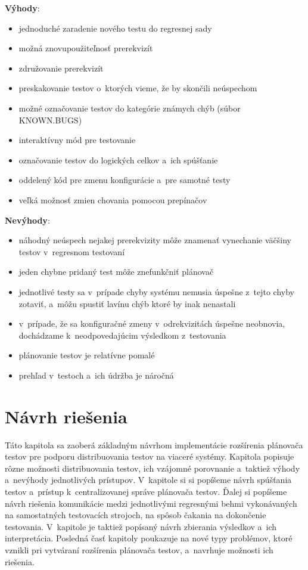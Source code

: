 \noindent \textbf{Výhody}:
\begin{itemize}
\item jednoduché zaradenie nového testu do regresnej sady
\item možná znovupoužiteľnosť prerekvizít
\item združovanie prerekvizít
\item preskakovanie testov o~ktorých vieme, že by skončili neúspechom
\item možné označovanie testov do kategórie známych chýb (súbor KNOWN.BUGS)
\item interaktívny mód pre testovanie
\item označovanie testov do logických celkov a~ich spúšťanie
\item oddelený kód pre zmenu konfigurácie a~pre samotné testy
\item veľká možnosť zmien chovania pomocou prepínačov
\end{itemize} 

\noindent \textbf{Nevýhody}:
\begin{itemize}
\item náhodný neúspech nejakej prerekvizity môže znamenať vynechanie väčšiny testov v~regresnom testovaní
\item jeden chybne pridaný test môže znefunkčniť plánovač
\item jednotlivé testy sa v~prípade chyby systému nemusia úspešne z~tejto chyby zotaviť, a~môžu spustiť lavínu chýb ktoré by inak nenastali 
\item v~prípade, že sa konfiguračné zmeny v~odrekvizitách úspešne neobnovia, dochádzame k~neodpovedajúcim výsledkom z~testovania
\item plánovanie testov je relatívne pomalé
\item prehľad v~testoch a~ich údržba je náročná
\end{itemize}


%
%
\chapter{Návrh riešenia}
\label{kapitola:navrh_riesenia}
Táto kapitola sa zaoberá základným návrhom implementácie rozšírenia plánovača testov pre podporu 
distribuovania testov na viaceré systémy. Kapitola popisuje rôzne
možnosti distribuovania testov, ich vzájomné porovnanie a~taktiež 
výhody a~nevýhody jednotlivých prístupov. V~kapitole si 
si popíšeme návrh spúšťania testov a~prístup k~centralizovanej správe plánovača testov.
Ďalej si popíšeme návrh riešenia komunikácie medzi jednotlivými
regresnými behmi vykonávaných na samostatných testovacích strojoch, 
na spôsob čakania na dokončenie testovania. 
V~kapitole je taktiež popísaný návrh zbierania výsledkov a~ich interpretácia.
Posledná časť kapitoly poukazuje na nové typy problémov, ktoré vznikli pri
vytváraní rozšírenia plánovača testov, a~navrhuje možnosti ich riešenia.


